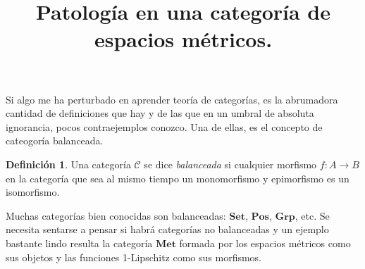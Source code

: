 \documentclass[draft,letter,10pt,notitlepage]{amsart}
\title{Patología en una categoría de espacios métricos.}
\date{}
\theoremstyle{definition}
\newtheorem*{definition}{Definición}
\theoremstyle{remark}
\begin{document}
\maketitle

Si algo me ha perturbado en aprender teoría de categorías, es 
la abrumadora cantidad de definiciones que hay y de las que
en un umbral de absoluta ignorancia, pocos contraejemplos
conozco. Una de ellas, es el concepto de cateogoría balanceada.

\begin{definition}
  Una categoría \( \mathcal{C}\) se dice \emph{balanceada}
  si cualquier morfismo \( f \colon A \to B\) en la categoría
  que sea al mismo tiempo un monomorfismo y epimorfismo
  es un isomorfismo.
\end{definition}

Muchas categorías bien conocidas son balanceadas: \( \mathbf{Set}\),
\( \mathbf{Pos}\), \( \mathbf{Grp}\), etc. Se necesita sentarse
a pensar si habrá categorías no balanceadas y un ejemplo bastante
lindo resulta la categoría \( \mathbf{Met}\) formada por
los espacios métricos como sus objetos y las funciones
1-Lipschitz como sus morfismos.
\end{document}
